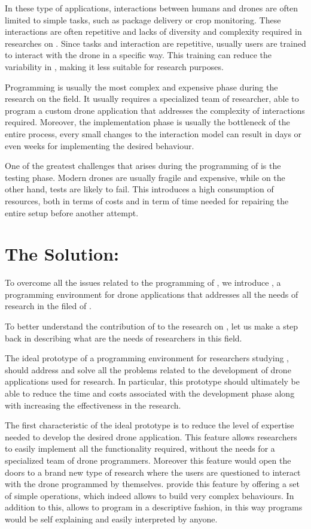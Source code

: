 In these type of applications, interactions between humans and drones are often limited to simple tasks, such as package delivery or crop monitoring. These interactions are often repetitive and lacks of diversity and complexity required in researches on \hdi{}. Since tasks and interaction are repetitive, usually users are trained to interact with the drone in a specific way. This training can reduce the variability in \hdi{}, making it less suitable for research purposes.

Programming \hdi{} is usually the most complex and expensive phase during the research on the field. It usually requires a specialized team of researcher, able to program a custom drone application that addresses the complexity of interactions required. Moreover, the implementation phase is usually the bottleneck of the entire process, every small changes to the interaction model can result in days or even weeks for implementing the desired behaviour.

One of the greatest challenges that arises during the programming of \hdi{} is the testing phase. Modern drones are usually fragile and expensive, while on the other hand, tests are likely to fail. This introduces a high consumption of resources, both in terms of costs and in term of time needed for repairing the entire setup before another attempt.

\section{The Solution: \easyfly}
\label{sec:the_solution}
To overcome all the issues related to the programming of \hdi{}, we introduce \easyfly{}, a programming environment for drone applications that addresses all the needs of research in the filed of \hdi{}.

To better understand the contribution of \easyfly{} to the research on \hdi{}, let us make a step back in describing what are the needs of researchers in this field.

The ideal prototype of a programming environment for researchers studying \hdi{}, should address and solve all the problems related to the development of drone applications used for research. In particular, this prototype should ultimately be able to reduce the time and costs associated with the development phase along with increasing the effectiveness in the research.

The first characteristic of the ideal prototype is to reduce the level of expertise needed to develop the desired drone application. This feature allows researchers to easily implement all the functionality required, without the needs for a specialized team of drone programmers. Moreover this feature would open the doors to a brand new type of research where the users are questioned to interact with the drone programmed by themselves. 
\easyfly{} provide this feature by offering a set of simple operations, which indeed allows to build very complex behaviours. In addition to this, \easyfly{} allows to program in a descriptive fashion, in this way programs would be self explaining and easily interpreted by anyone.

